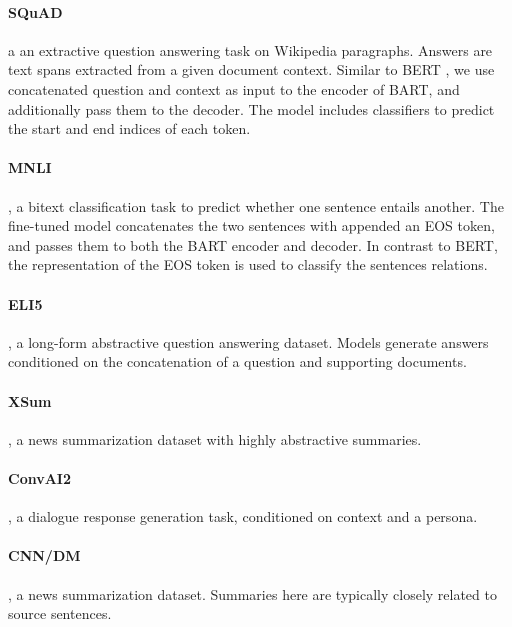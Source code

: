 \documentclass{article} %
\begin{document}
\paragraph{SQuAD} \cite{squad}a an extractive question answering task on Wikipedia paragraphs. Answers are text spans extracted from a given document context. Similar to BERT \cite{bert}, we use concatenated question and context as input to the encoder of BART, and additionally pass them to the decoder. The model includes classifiers to predict the start and end indices of each token. 
\paragraph{MNLI} \citep{mnli}, a bitext classification task to predict whether one sentence entails another. The fine-tuned model concatenates the two sentences with  appended an EOS token, and passes them to both the BART encoder and decoder. In contrast to BERT, the representation of the EOS token is used to classify the sentences relations. 
\paragraph{ELI5} \citep{eli5}, a long-form abstractive question answering dataset. Models generate answers conditioned on the concatenation of a question and supporting documents. %
\paragraph{XSum} \citep{xsum}, a news summarization dataset with highly abstractive summaries. %
\paragraph{ConvAI2} \citep{convai2}, a dialogue response generation task, conditioned on context and a persona.
\paragraph{CNN/DM} \citep{cnn}, a news summarization dataset. Summaries here are typically closely related to source sentences. %
\end{document}
